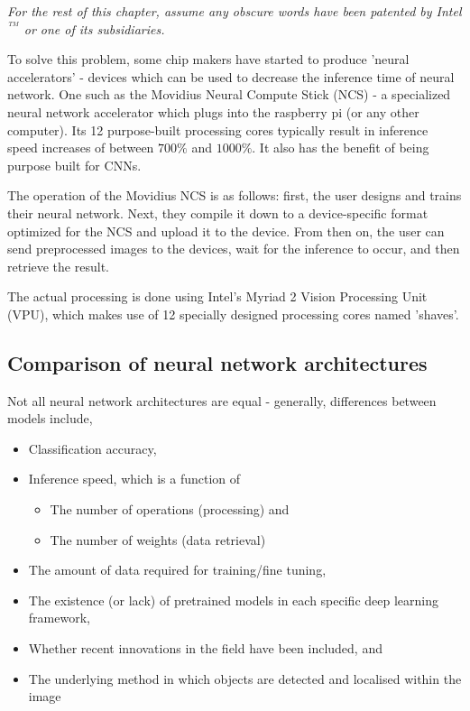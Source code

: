 
\textit{For the rest of this chapter, assume any obscure words have been patented by Intel$^{^{\ TM}}$ or one of its subsidiaries.}

To solve this problem, some chip makers have started to produce 'neural accelerators' - devices which can be used to decrease the inference time of neural network. One such as the Movidius Neural Compute Stick (NCS) - a specialized neural network accelerator which plugs into the raspberry pi (or any other computer). Its 12 purpose-built processing cores typically result in inference speed increases of between $700\%$ and $1000\%$. It also has the benefit of being purpose built for CNNs.

The operation of the Movidius NCS is as follows: first, the user designs and trains their neural network. Next, they compile it down to a device-specific format optimized for the NCS and upload it to the device. From then on, the user can send preprocessed images to the devices, wait for the inference to occur, and then retrieve the result.

The actual processing is done using Intel's Myriad 2 Vision Processing Unit (VPU), which makes use of 12 specially designed processing cores named 'shaves'.




\subsection{Comparison of neural network architectures}
Not all neural network architectures are equal - generally, differences between models include,

\begin{itemize}
	\item Classification accuracy,
	\item Inference speed, which is a function of
	\begin{itemize}
		\item The number of operations (processing) and
		\item The number of weights (data retrieval)
	\end{itemize}
	\item The amount of data required for training/fine tuning,
	\item The existence (or lack) of pretrained models in each specific deep learning framework,
	\item Whether recent innovations in the field have been included, and
	\item The underlying method in which objects are detected and localised within the image
\end{itemize}


